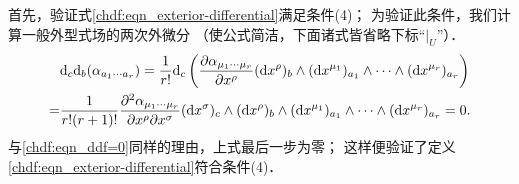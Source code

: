 
首先，验证式\eqref{chdf:eqn_exterior-differential}满足条件(4)；
为验证此条件，我们计算一般外型式场的两次外微分
（使公式简洁，下面诸式皆省略下标“$|_U$”）．
\begin{align*}
    & {\rm d}_{c}{\rm d}_{b}(\alpha_{a_1\cdots a_r})
    = \frac{1}{r!} {\rm d}_{c}\left(\frac{\partial \alpha_{\mu_{1}\cdots \mu_{r}}}{\partial x^\rho}
    ({\rm d}x^\rho)_{b} \wedge
    ({\rm d}x^{\mu_1})_{a_{1}} \wedge\cdots\wedge ({\rm d}x^{\mu_r})_{a_{r}}  \right) \\
    =& \frac{1}{r!(r+1)!}
    \frac{\partial^2 \alpha_{\mu_{1}\cdots \mu_{r}}}{\partial x^\rho \partial x^\sigma}
    ({\rm d}x^\sigma)_{c} \wedge ({\rm d}x^\rho)_{b} \wedge
    ({\rm d}x^{\mu_1})_{a_{1}} \wedge\cdots\wedge ({\rm d}x^{\mu_r})_{a_{r}}  =0.
\end{align*}
与\eqref{chdf:eqn_ddf=0}同样的理由，上式最后一步为零；
这样便验证了定义\eqref{chdf:eqn_exterior-differential}符合条件(4)．

